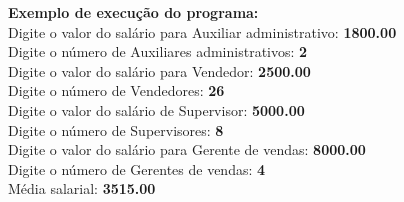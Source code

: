 \documentclass[paper=a4, fontsize=11pt]{scrartcl} %
\numberwithin{equation}{section} %
\numberwithin{figure}{section} %
\numberwithin{table}{section} %
\begin{document}
\textbf{Exemplo de execução do programa:}\\

Digite o valor do salário para Auxiliar administrativo: \textbf{1800.00} \\
Digite o número de Auxiliares administrativos: \textbf{2} \\
Digite o valor do salário para Vendedor: \textbf{2500.00} \\
Digite o número de Vendedores: \textbf{26} \\
Digite o valor do salário de Supervisor: \textbf{5000.00} \\
Digite o número de Supervisores: \textbf{8} \\
Digite o valor do salário para Gerente de vendas: \textbf{8000.00} \\
Digite o número de Gerentes de vendas: \textbf{4} \\

Média salarial: \textbf{3515.00}
\end{document}
